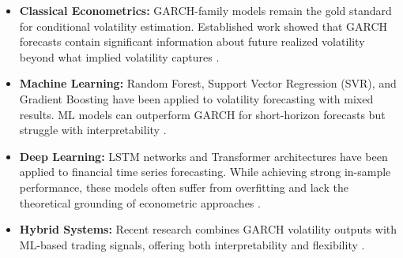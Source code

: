 \documentclass[journal]{IEEEtran}
\begin{document}
\begin{itemize}
  \item \textbf{Classical Econometrics:} GARCH-family models remain the
    gold standard for conditional volatility estimation. Established
    work showed that GARCH forecasts contain significant information
    about future realized volatility beyond what implied volatility
    captures \cite{duan1995}.

  \item \textbf{Machine Learning:} Random Forest, Support Vector
    Regression (SVR), and Gradient Boosting have been applied to
    volatility forecasting with mixed results. ML models can outperform
    GARCH for short-horizon forecasts but struggle with interpretability
    \cite{nguyen2021}.

  \item \textbf{Deep Learning:} LSTM networks and Transformer
    architectures have been applied to financial time series
    forecasting. While achieving strong in-sample performance, these
    models often suffer from overfitting and lack the theoretical
    grounding of econometric approaches \cite{zhang2022,smith2021}.

  \item \textbf{Hybrid Systems:} Recent research combines GARCH
    volatility outputs with ML-based trading signals, offering both
    interpretability and flexibility \cite{wang2023}.
\end{itemize}
\end{document}
